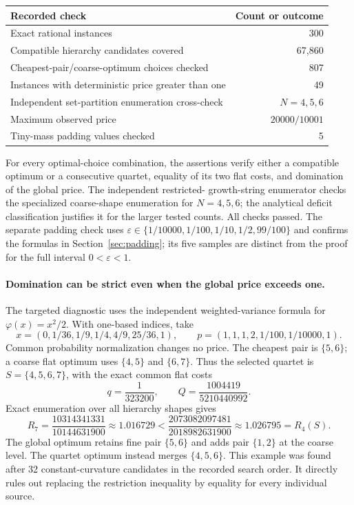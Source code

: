 \begin{center}\small
\begin{tabular}{@{}lr@{}}
\toprule
Recorded check & Count or outcome\\
\midrule
Exact rational instances & 300\\
Compatible hierarchy candidates covered & 67,860\\
Cheapest-pair/coarse-optimum choices checked & 807\\
Instances with deterministic price greater than one & 49\\
Independent set-partition enumeration cross-check & $N=4,5,6$\\
Maximum observed price & $20000/10001$\\
Tiny-mass padding values checked & 5\\
\bottomrule
\end{tabular}
\end{center}
For every optimal-choice combination, the assertions verify either a
compatible optimum or a consecutive quartet, equality of its two flat
costs, and domination of the global price. The independent restricted-
growth-string enumerator checks the specialized coarse-shape enumeration
for $N=4,5,6$; the analytical deficit classification justifies it for the
larger tested counts. All checks passed. The separate padding check uses
$\varepsilon\in\{1/10000,1/100,1/10,1/2,99/100\}$ and confirms the
formulas in Section~\ref{sec:padding}; its five samples are distinct from
the proof for the full interval $0<\varepsilon<1$.

\paragraph{Domination can be strict even when the global price exceeds one.}
The targeted diagnostic uses the independent weighted-variance formula
for $\varphi(x)=x^2/2$. With one-based indices, take
\[
 x=(0,1/36,1/9,1/4,4/9,25/36,1),\qquad
 p=(1,1,1,2,1/100,1/10000,1).
\]
Common probability normalization changes no price. The cheapest pair is
$\{5,6\}$; a coarse flat optimum uses $\{4,5\}$ and $\{6,7\}$. Thus the
selected quartet is $S=\{4,5,6,7\}$, with the exact common flat costs
\[
 q=\frac1{323200},\qquad Q=\frac{1004419}{5210440992}.
\]
Exact enumeration over all hierarchy shapes gives
\[
 R_7=\frac{10314341331}{10144631900}\approx1.016729
 <\frac{2073082097481}{2018982631900}\approx1.026795=R_4(S).
\]
The global optimum retains fine pair $\{5,6\}$ and adds pair $\{1,2\}$
at the coarse level. The quartet optimum instead merges $\{4,5,6\}$.
This example was found after 32 constant-curvature candidates in the
recorded search order. It directly rules out replacing the restriction
inequality by equality for every individual source.
